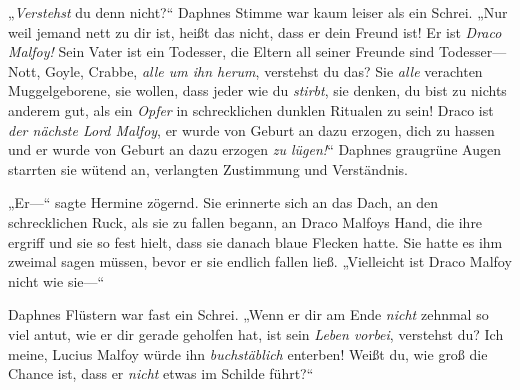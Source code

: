 „\emph{Verstehst} du denn nicht?“ Daphnes Stimme war kaum leiser als ein Schrei. „Nur weil jemand nett zu dir ist, heißt das nicht, dass er dein Freund ist! Er ist \emph{Draco Malfoy!} Sein Vater ist ein Todesser, die Eltern all seiner Freunde sind Todesser—Nott, Goyle, Crabbe, \emph{alle um ihn herum}, verstehst du das? Sie \emph{alle} verachten Muggelgeborene, sie wollen, dass jeder wie du \emph{stirbt}, sie denken, du bist zu nichts anderem gut, als ein \emph{Opfer} in schrecklichen dunklen Ritualen zu sein! Draco ist \emph{der nächste Lord Malfoy}, er wurde von Geburt an dazu erzogen, dich zu hassen und er wurde von Geburt an dazu erzogen \emph{zu lügen!}“ Daphnes graugrüne Augen starrten sie wütend an, verlangten Zustimmung und Verständnis.

„Er—“ sagte Hermine zögernd. Sie erinnerte sich an das Dach, an den schrecklichen Ruck, als sie zu fallen begann, an Draco Malfoys Hand, die ihre ergriff und sie so fest hielt, dass sie danach blaue Flecken hatte. Sie hatte es ihm zweimal sagen müssen, bevor er sie endlich fallen ließ. „Vielleicht ist Draco Malfoy nicht wie sie—“

Daphnes Flüstern war fast ein Schrei. „Wenn er dir am Ende \emph{nicht} zehnmal so viel antut, wie er dir gerade geholfen hat, ist sein \emph{Leben vorbei}, verstehst du? Ich meine, Lucius Malfoy würde ihn \emph{buchstäblich} enterben! Weißt du, wie groß die Chance ist, dass er \emph{nicht} etwas im Schilde führt?“


